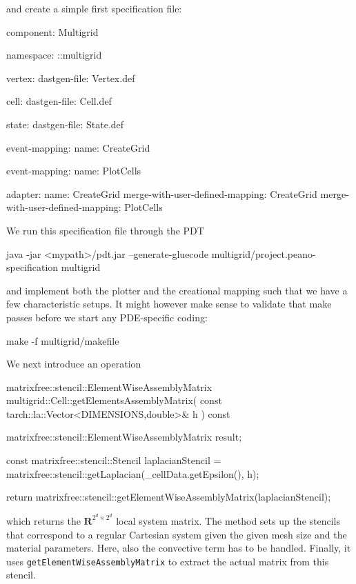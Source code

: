 \noindent
and create a simple first specification file:
\begin{code}
component: Multigrid

namespace: ::multigrid

vertex:
  dastgen-file: Vertex.def
  
cell:
  dastgen-file: Cell.def

state:
  dastgen-file: State.def

event-mapping:
  name: CreateGrid

event-mapping:
  name: PlotCells

adapter:
  name: CreateGrid
  merge-with-user-defined-mapping: CreateGrid
  merge-with-user-defined-mapping: PlotCells
  
\end{code}

\noindent
We run this specification file through the PDT

\begin{code}
java -jar <mypath>/pdt.jar --generate-gluecode multigrid/project.peano-specification multigrid
\end{code}


\noindent
and implement both the plotter and the creational mapping such that we have a
few characteristic setups. 
It might however make sense to validate that make passes before we start any
PDE-specific coding:
\begin{code}
make -f multigrid/makefile
\end{code}


\noindent
We next introduce an operation 
\begin{code}
matrixfree::stencil::ElementWiseAssemblyMatrix multigrid::Cell::getElementsAssemblyMatrix(
  const tarch::la::Vector<DIMENSIONS,double>&  h
) const {
  matrixfree::stencil::ElementWiseAssemblyMatrix result;

  const matrixfree::stencil::Stencil laplacianStencil = 
    matrixfree::stencil::getLaplacian(_cellData.getEpsilon(), h);

  return matrixfree::stencil::getElementWiseAssemblyMatrix(laplacianStencil);
}
\end{code}
which returns the $\mathbf{R}^{2^d \times 2^d}$ local system matrix. 
The method sets up the stencils that correspond to a regular Cartesian system
given the given mesh size  and the material parameters.
Here, also the convective term has to be handled.
Finally, it uses \texttt{getElementWiseAssemblyMatrix} to extract the actual
matrix from this stencil.

